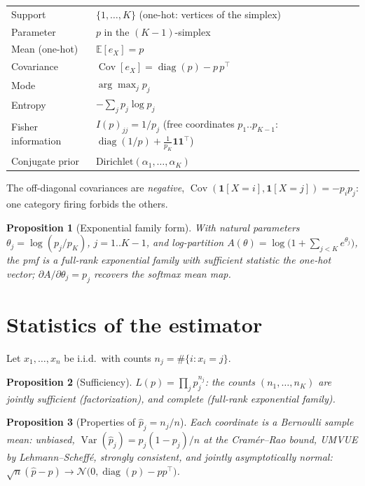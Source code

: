\documentclass[11pt]{article}
\newtheorem{proposition}{Proposition}
\theoremstyle{remark}
\newcommand{\E}{\mathbb{E}}
\newcommand{\Var}{\operatorname{Var}}
\begin{document}
\begin{center}
\begin{tabular}{ll}
\toprule
Support & $\{1, \dots, K\}$ (one-hot: vertices of the simplex)\\
Parameter & $p$ in the $(K{-}1)$-simplex\\
Mean (one-hot) & $\E[e_X] = p$\\
Covariance & $\operatorname{Cov}[e_X] =
  \operatorname{diag}(p) - p\,p^{\!\top}$\\
Mode & $\arg\max_j p_j$\\
Entropy & $-\sum_j p_j \log p_j$\\
Fisher information & $I(p)_{jj} = 1/p_j$ (free coordinates
  $p_1..p_{K-1}$: $\operatorname{diag}(1/p) + \tfrac{1}{p_K}
  \mathbf{1}\mathbf{1}^{\!\top}$)\\
Conjugate prior & $\mathrm{Dirichlet}(\alpha_1, \dots, \alpha_K)$\\
\bottomrule
\end{tabular}
\end{center}

The off-diagonal covariances are \emph{negative},
$\operatorname{Cov}(\mathbf{1}[X{=}i], \mathbf{1}[X{=}j]) =
-p_i p_j$: one category firing forbids the others.

\begin{proposition}[Exponential family form]
With natural parameters $\theta_j = \log(p_j / p_K)$,
$j = 1..K{-}1$, and log-partition
$A(\theta) = \log\bigl(1 + \sum_{j<K} e^{\theta_j}\bigr)$, the pmf is
a full-rank exponential family with sufficient statistic the one-hot
vector; $\partial A/\partial \theta_j = p_j$ recovers the softmax
mean map.
\end{proposition}

\section{Statistics of the estimator}

Let $x_1, \dots, x_n$ be i.i.d.\ with counts
$n_j = \#\{i : x_i = j\}$.

\begin{proposition}[Sufficiency]
$L(p) = \prod_j p_j^{n_j}$: the counts $(n_1, \dots, n_K)$ are
jointly sufficient (factorization), and complete (full-rank
exponential family).
\end{proposition}

\begin{proposition}[Properties of $\hat p_j = n_j / n$]
Each coordinate is a Bernoulli sample mean: unbiased,
$\Var(\hat p_j) = p_j(1 - p_j)/n$ at the Cram\'er--Rao bound,
UMVUE by Lehmann--Scheff\'e, strongly consistent, and jointly
asymptotically normal:
$\sqrt{n}(\hat p - p) \to \mathcal{N}\bigl(0,
\operatorname{diag}(p) - pp^{\!\top}\bigr)$.
\end{proposition}
\end{document}

